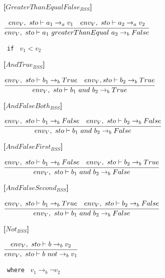 \textbf{[$GreaterThanEqualFalse_{BSS}$]}\\
\begin{center}
	\begin{math}
	\cfrac
	{env_V,\ sto \vdash a_1 \rightarrow_a v_1 \quad env_V,\ sto \vdash a_2 \rightarrow_a v_2}
	{env_V,\ sto \vdash a_1\ greaterThanEqual\ a_2 \rightarrow_b False}
	\end{math}
	
	\texttt{ if } $v_1 < v_2$
\end{center}

\textbf{[$AndTrue_{BSS}$]}\\
\begin{center}
	\begin{math}
	\cfrac
		{env_V,\ sto \vdash b_1 \rightarrow_b True \quad env_V, sto \vdash b_2 \rightarrow_b True}
		{env_V,\ sto \vdash b_1\ and\ b_2 \rightarrow_b True}
	\end{math}
\end{center}

\textbf{[$AndFalseBoth_{BSS}$]}\\
\begin{center}
	\begin{math}
	\cfrac
		{env_V,\ sto \vdash b_1 \rightarrow_b False \quad env_V,\ sto \vdash b_2 \rightarrow_b False}
		{env_V,\ sto \vdash b_1\ and\ b_2 \rightarrow_b False}
	\end{math}
\end{center}

\textbf{[$AndFalseFirst_{BSS}$]}\\
\begin{center}
	\begin{math}
	\cfrac
	{env_V,\ sto \vdash b_1 \rightarrow_b False \quad env_V,\ sto \vdash b_2 \rightarrow_b True}
	{env_V,\ sto \vdash b_1\ and\ b_2 \rightarrow_b False}
	\end{math}
\end{center}

\textbf{[$AndFalseSecond_{BSS}$]}\\
\begin{center}
	\begin{math}
	\cfrac
	{env_V,\ sto \vdash b_1 \rightarrow_b True \quad env_V,\ sto \vdash b_2 \rightarrow_b False}
	{env_V,\ sto \vdash b_1\ and\ b_2 \rightarrow_b False}
	\end{math}
\end{center}

\textbf{[$Not_{BSS}$]}\\
\begin{center}
	\begin{math}
	\cfrac
	{env_V,\ sto \vdash b \rightarrow_b v_2}
	{env_V,\ sto \vdash b\ not \rightarrow_b v_1}
	\end{math}
	
	\texttt{ where } $v_1 \rightarrow_b \neg v_2$
\end{center}

